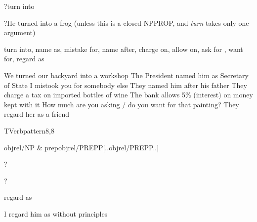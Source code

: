 
\begin{thetadescr}
\evitem ?turn into
\esitem
     \begin{examples}
        \example ?He turned into a frog (unless this is a closed NPPROP, and
                 {\em turn\/} takes only one argument)
     \end{examples}
\end{thetadescr}



\begin{thetadescr}
\evitem turn into, 
name as, mistake for, 
name after,
 charge on, allow on, ask for
, want for, regard as
\esitem
     \begin{examples}
        \example  We turned our backyard into a workshop
        \example  The President named him as Secretary of State
        \example  I mistook you for somebody else
        \example  They named him after his father
        \example  They charge a tax on imported bottles of wine
        \example  The bank allows 5\% (interest) on money kept with it
        \example  How much are you asking / do you want for that painting?
        \example  They regard her as a friend
     \end{examples}
\end{thetadescr}


\newpage
{}
\begin{vpattern}
 TVerbpattern8,8
\csritem \mbox{}\\
     \begin{csr}
       objrel/NP & prepobjrel/PREPP[..objrel/PREPP..] 
     \end{csr}
\remarksitem
\end{vpattern}


\begin{thetadescr}
\evitem ?
\esitem
     \begin{examples}
        \example  ?
     \end{examples}
\end{thetadescr}



\begin{thetadescr}
\evitem  regard as
\esitem
     \begin{examples}
        \example I regard him as without principles
     \end{examples}
\end{thetadescr}


